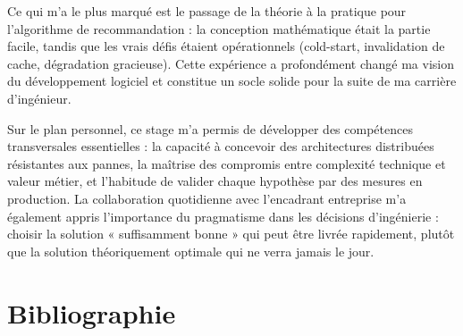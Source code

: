 \documentclass[12pt,a4paper,openany]{report}
\begin{document}
Ce qui m'a le plus marqué est le passage de la théorie à la pratique pour l'algorithme de recommandation : la conception mathématique était la partie facile, tandis que les vrais défis étaient opérationnels (cold-start, invalidation de cache, dégradation gracieuse). Cette expérience a profondément changé ma vision du développement logiciel et constitue un socle solide pour la suite de ma carrière d'ingénieur.

Sur le plan personnel, ce stage m'a permis de développer des compétences transversales essentielles : la capacité à concevoir des architectures distribuées résistantes aux pannes, la maîtrise des compromis entre complexité technique et valeur métier, et l'habitude de valider chaque hypothèse par des mesures en production. La collaboration quotidienne avec l'encadrant entreprise m'a également appris l'importance du pragmatisme dans les décisions d'ingénierie : choisir la solution « suffisamment bonne » qui peut être livrée rapidement, plutôt que la solution théoriquement optimale qui ne verra jamais le jour.

\chapter*{Bibliographie}
\end{document}
